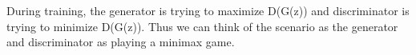 During training, the generator is trying to maximize D(G(z)) and discriminator is trying to minimize D(G(z)).  Thus we can think of the scenario as the generator and discriminator as playing a minimax game.
